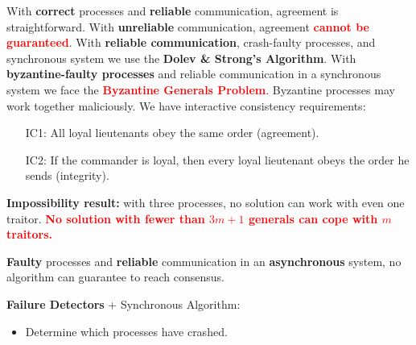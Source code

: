 With \textbf{correct} processes and \textbf{reliable} communication, agreement is straightforward.
With \textbf{unreliable} communication, agreement \textbf{\textcolor{red}{cannot be guaranteed}}.
With \textbf{reliable communication}, crash-faulty processes, and synchronous system we use the \textbf{Dolev \& Strong's Algorithm}.
With \textbf{byzantine-faulty processes} and reliable communication in a synchronous system we face the \textbf{\textcolor{red}{Byzantine Generals Problem}}.
Byzantine processes may work together maliciously. We have interactive consistency requirements:
\begin{itemize}
    \item[IC1:] All loyal lieutenants obey the same order (agreement).
    \item[IC2:] If the commander is loyal, then every loyal lieutenant obeys the order he sends (integrity).
\end{itemize}
\textbf{Impossibility result:} with three processes, no solution can work with even one traitor.
\textbf{\textcolor{red}{No solution with fewer than $3m + 1$ generals can cope with $m$ traitors.}}

\textbf{Faulty} processes and \textbf{reliable} communication in an \textbf{asynchronous} system, no algorithm can guarantee to reach consensus.

\textbf{Failure Detectors} + Synchronous Algorithm:
\begin{itemize}
    \item Determine which processes have crashed.
\end{itemize}
